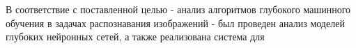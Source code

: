 В соответствие с поставленной целью - анализ алгоритмов глубокого машинного обучения в задачах распознавания изображений - был проведен анализ моделей глубоких нейронных сетей, а также реализована система для

\clearpage